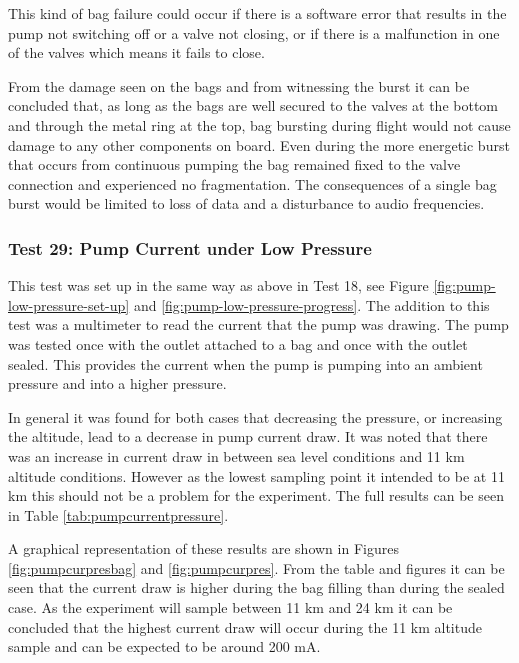 This kind of bag failure could occur if there is a software error that results in the pump not switching off or a valve not closing, or if there is a malfunction in one of the valves which means it fails to close.

From the damage seen on the bags and from witnessing the burst it can be concluded that, as long as the bags are well secured to the valves at the bottom and through the metal ring at the top, bag bursting during flight would not cause damage to any other components on board. Even during the more energetic burst that occurs from continuous pumping the bag remained fixed to the valve connection and experienced no fragmentation. The consequences of a single bag burst would be limited to loss of data and a disturbance to audio frequencies. 

\subsubsection{Test 29: Pump Current under Low Pressure}
\label{sec:test29result}

This test was set up in the same way as above in Test 18, see Figure \ref{fig:pump-low-pressure-set-up} and \ref{fig:pump-low-pressure-progress}. The addition to this test was a multimeter to read the current that the pump was drawing. The pump was tested once with the outlet attached to a bag and once with the outlet sealed. This provides the current when the pump is pumping into an ambient pressure and into a higher pressure.

In general it was found for both cases that decreasing the pressure, or increasing the altitude, lead to a decrease in pump current draw. It was noted that there was an increase in current draw in between sea level conditions and 11 km altitude conditions. However as the lowest sampling point it intended to be at 11 km this should not be a problem for the experiment. The full results can be seen in Table \ref{tab:pumpcurrentpressure}. 



A graphical representation of these results are shown in Figures \ref{fig:pumpcurpresbag} and \ref{fig:pumpcurpres}. From the table and figures it can be seen that the current draw is higher during the bag filling than during the sealed case. As the experiment will sample between 11 km and 24 km it can be concluded that the highest current draw will occur during the 11 km altitude sample and can be expected to be around 200 mA. 

